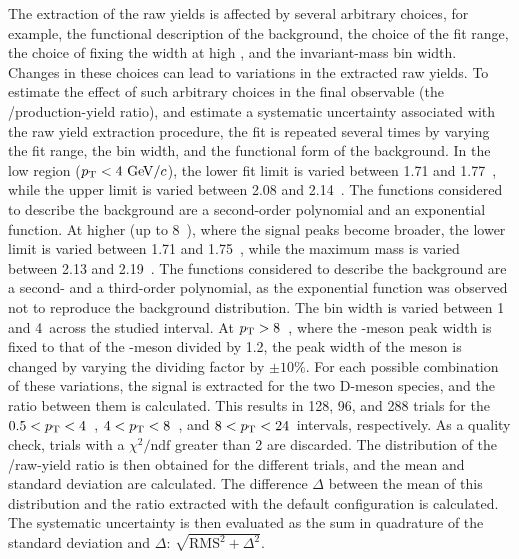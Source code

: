 The extraction of the raw yields is affected by several arbitrary choices, for example, the functional description of the background, the choice of the fit range, the choice of fixing the \dpl width at high \pt, and the invariant-mass bin width. Changes in these choices can lead to variations in the extracted raw yields. To estimate the effect of such arbitrary choices in the final observable (the \ds/\dpl production-yield ratio), and estimate a systematic uncertainty associated with the raw yield extraction procedure, the fit is repeated several times by varying the fit range, the bin width, and the functional form of the background. In the low \pt region ($p_\mathrm{T}<4~\mathrm{Ge\kern-.1emV}/c$), the lower fit limit is varied between 1.71 and 1.77~\gevcc, while the upper limit is varied between 2.08 and 2.14~\gevcc. The functions considered to describe the background are a second-order polynomial and an exponential function. At higher \pt (up to 8~\gevc), where the signal peaks become broader, the lower limit is varied between 1.71 and 1.75~\gevcc, while the maximum mass is varied between 2.13 and 2.19~\gevcc. The functions considered to describe the background are a second- and a third-order polynomial, as the exponential function was observed not to reproduce the background distribution. The bin width is varied between 1 and 4~\mevcc across the studied \pt interval. At $p_\mathrm{T}>8$~\gevcc, where the \dpl-meson peak width is fixed to that of the \ds-meson divided by 1.2, the peak width of the \dpl meson is changed by varying the dividing factor by $\pm10\%$. For each possible combination of these variations, the signal is extracted for the two D-meson species, and the ratio between them is calculated. This results in 128, 96, and 288 trials for the $0.5<p_\mathrm{T}<4$~\gevc, $4<p_\mathrm{T}<8$~\gevc, and $8<p_\mathrm{T}<24$~\gevc intervals, respectively. As a quality check, trials with a $\chi^2/\mathrm{ndf}$ greater than 2 are discarded. The distribution of the \ds/\dpl raw-yield ratio is then obtained for the different trials, and the mean and standard deviation are calculated. The difference $\Delta$ between the mean of this distribution and the ratio extracted with the default configuration is calculated. The systematic uncertainty is then evaluated as the sum in quadrature of the standard deviation and $\Delta$: $\sqrt{\mathrm{RMS^2}+\Delta^2}$.

